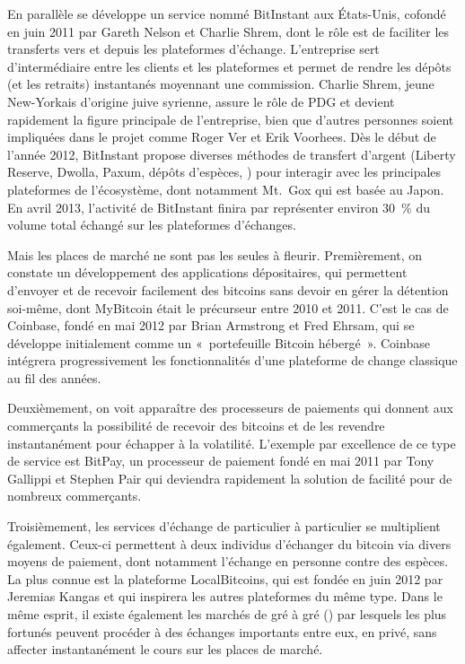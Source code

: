 En parallèle se développe un service nommé BitInstant aux États-Unis, cofondé en juin 2011 par Gareth Nelson et Charlie Shrem, dont le rôle est de faciliter les transferts vers et depuis les plateformes d'échange. L'entreprise sert d'intermédiaire entre les clients et les plateformes et permet de rendre les dépôts (et les retraits) instantanés moyennant une commission. Charlie Shrem, jeune New-Yorkais d'origine juive syrienne, assure le rôle de PDG et devient rapidement la figure principale de l'entreprise, bien que d'autres personnes soient impliquées dans le projet comme Roger Ver et Erik Voorhees. Dès le début de l'année 2012, BitInstant propose diverses méthodes de transfert d'argent (Liberty Reserve, Dwolla, Paxum, dépôts d'espèces, ) pour interagir avec les principales plateformes de l'écosystème, dont notamment Mt.~Gox qui est basée au Japon. En avril 2013, l'activité de BitInstant finira par représenter environ 30~\% du volume total échangé sur les plateformes d'échanges.

Mais les places de marché ne sont pas les seules à fleurir. Premièrement, on constate un développement des applications dépositaires, qui permettent d'envoyer et de recevoir facilement des bitcoins sans devoir en gérer la détention soi-même, dont MyBitcoin était le précurseur entre 2010 et 2011. C'est le cas de Coinbase, fondé en mai 2012 par Brian Armstrong et Fred Ehrsam, qui se développe initialement comme un «~portefeuille Bitcoin hébergé~». Coinbase intégrera progressivement les fonctionnalités d'une plateforme de change classique au fil des années.

Deuxièmement, on voit apparaître des processeurs de paiements qui donnent aux commerçants la possibilité de recevoir des bitcoins et de les revendre instantanément pour échapper à la volatilité. L'exemple par excellence de ce type de service est BitPay, un processeur de paiement fondé en mai 2011 par Tony Gallippi et Stephen Pair qui deviendra rapidement la solution de facilité pour de nombreux commerçants.

Troisièmement, les services d'échange de particulier à particulier se multiplient également. Ceux-ci permettent à deux individus d'échanger du bitcoin via divers moyens de paiement, dont notamment l'échange en personne contre des espèces. La plus connue est la plateforme LocalBitcoins, qui est fondée en juin 2012 par Jeremias Kangas et qui inspirera les autres plateformes du même type. Dans le même esprit, il existe également les marchés de gré à gré () par lesquels les plus fortunés peuvent procéder à des échanges importants entre eux, en privé, sans affecter instantanément le cours sur les places de marché.

